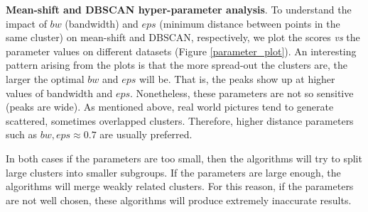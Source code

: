 \documentclass[conference]{IEEEtran}
\begin{document}
\textbf{Mean-shift and DBSCAN hyper-parameter analysis}. To understand the impact of $bw$ (bandwidth) and $eps$ (minimum distance between points in the same cluster) on mean-shift and DBSCAN, respectively, we plot the scores \textit{vs} the parameter values on different datasets (Figure \ref{parameter_plot}).
An interesting pattern arising from the plots is that the more spread-out the clusters are, the larger the optimal $bw$ and $eps$ will be.
That is, the peaks show up at higher values of bandwidth and $eps$.
Nonetheless, these parameters are not so sensitive (peaks are wide).
As mentioned above, real world pictures tend to generate scattered, sometimes overlapped clusters.
Therefore, higher distance parameters such as $bw, eps \approx 0.7$ are usually preferred.

In both cases if the parameters are too small, then the algorithms will try to split large clusters into smaller subgroups.
If the parameters are large enough, the algorithms will merge weakly related clusters.
For this reason, if the parameters are not well chosen, these algorithms will produce extremely inaccurate results.
\end{document}
